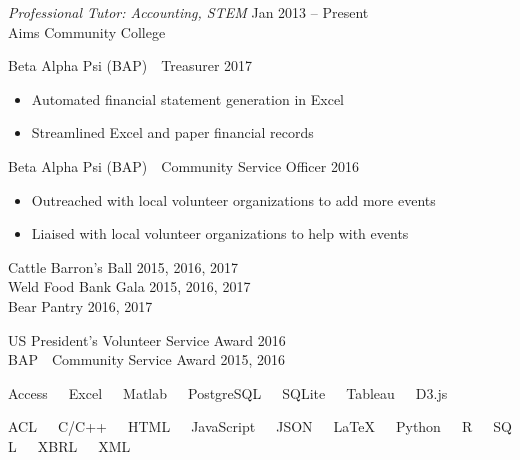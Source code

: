 \documentclass[10pt]{article}
\begin{document}
\begin{description}[leftmargin=!,labelwidth=3cm,align=left,itemsep=-9px,partopsep=-5px]
    \textit{Professional Tutor: Accounting, STEM} \hfill Jan 2013 -- Present\\
    Aims Community College
\item[\rule{196mm}{0.5pt}]
%
%
\item[Leadership]
    Beta Alpha Psi (BAP)\ \ Treasurer \hfill 2017
    \begin{itemize}[rightmargin=2cm,noitemsep]%
        \item Automated financial statement generation in Excel
        \item Streamlined Excel and paper financial records
    \end{itemize}
    Beta Alpha Psi (BAP)\ \ Community Service Officer \hfill 2016
    \begin{itemize}[rightmargin=2cm,noitemsep]%
        \item Outreached with local volunteer organizations to add more events
        \item Liaised with local volunteer organizations to help with events
    \end{itemize}
\item[\rule{196mm}{0.5pt}]
%
%
\item[Volunteering]
	Cattle Barron's Ball \hfill 2015, 2016, 2017\\
	Weld Food Bank Gala  \hfill 2015, 2016, 2017\\
	Bear Pantry	         \hfill       2016, 2017
\item[\rule{196mm}{0.5pt}]
%
%
\item[Awards]
    US President's Volunteer Service Award \hfill 2016\\
    BAP\ \ Community Service Award \hfill 2015, 2016
\item[\rule{196mm}{0.5pt}]
%
%
\item[Tools]
    Access\ \ \ Excel\ \ \ Matlab\ \ \ PostgreSQL\ \ \ SQLite\ \ \ Tableau\ \ \ D3.js\\

\item[Languages]
    ACL\ \ \ C/C++\ \ \ HTML\ \ \ JavaScript\ \ \ JSON\ \ \ LaTeX\ \ \ Python\ \ \ R\ \ \ SQL\ \ \ XBRL\ \ \ XML


\end{description}
\end{document}
